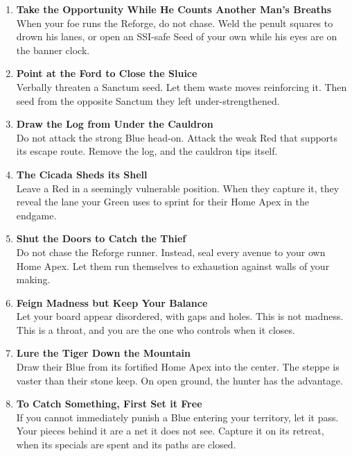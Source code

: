 \documentclass[11pt]{article}
\begin{document}
\begin{enumerate}[leftmargin=\textit{,label=\textbf{\arabic}.}]
\item \textbf{Take the Opportunity While He Counts Another Man's Breaths}\\
When your foe runs the Reforge, do not chase. Weld the penult squares to drown his lanes, or open an SSI-safe Seed of your own while his eyes are on the banner clock.

\item \textbf{Point at the Ford to Close the Sluice}\\
Verbally threaten a Sanctum seed. Let them waste moves reinforcing it. Then seed from the opposite Sanctum they left under-strengthened.

\item \textbf{Draw the Log from Under the Cauldron}\\
Do not attack the strong Blue head-on. Attack the weak Red that supports its escape route. Remove the log, and the cauldron tips itself.

\item \textbf{The Cicada Sheds its Shell}\\
Leave a Red in a seemingly vulnerable position. When they capture it, they reveal the lane your Green uses to sprint for their Home Apex in the endgame.

\item \textbf{Shut the Doors to Catch the Thief}\\
Do not chase the Reforge runner. Instead, seal every avenue to your own Home Apex. Let them run themselves to exhaustion against walls of your making.

\item \textbf{Feign Madness but Keep Your Balance}\\
Let your board appear disordered, with gaps and holes. This is not madness. This is a throat, and you are the one who controls when it closes.

\item \textbf{Lure the Tiger Down the Mountain}\\
Draw their Blue from its fortified Home Apex into the center. The steppe is vaster than their stone keep. On open ground, the hunter has the advantage.

\item \textbf{To Catch Something, First Set it Free}\\
If you cannot immediately punish a Blue entering your territory, let it pass. Your pieces behind it are a net it does not see. Capture it on its retreat, when its specials are spent and its paths are closed.


\end{enumerate}
\end{document}
